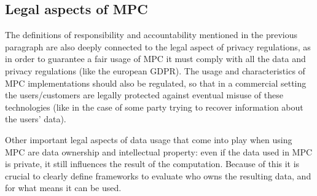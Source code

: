 \subsection{Legal aspects of MPC}

The definitions of responsibility and accountability mentioned in the previous paragraph are also deeply connected to the legal aspect of privacy regulations, as in order to guarantee a fair usage of MPC it must comply with all the data and privacy regulations (like the european GDPR). The usage and characteristics of MPC implementations should also be regulated, so that in a commercial setting the users/customers are legally protected against eventual misuse of these technologies (like in the case of some party trying to recover information about the users' data).

Other important legal aspects of data usage that come into play when using MPC are data ownership and intellectual property: even if the data used in MPC is private, it still influences the result of the computation. Because of this it is crucial to clearly define frameworks to evaluate who owns the resulting data, and for what means it can be used.